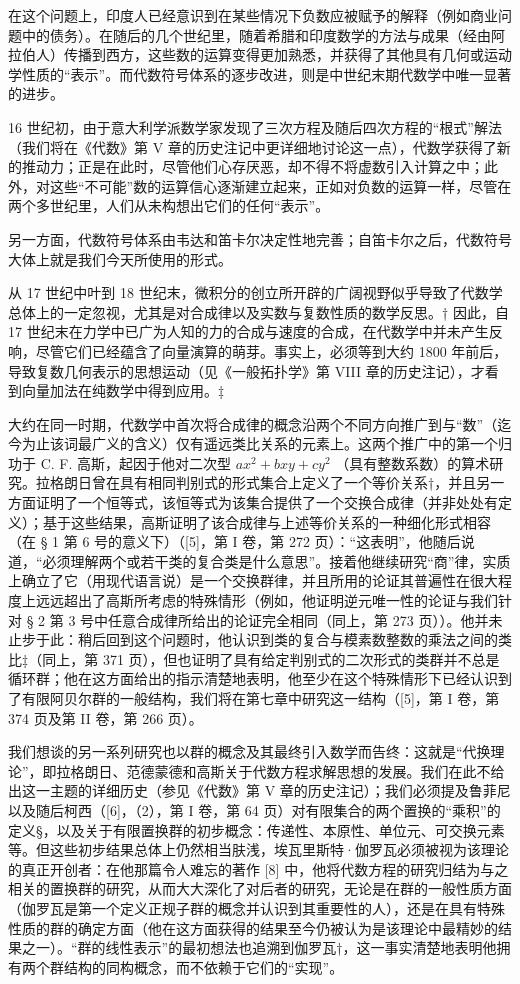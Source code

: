 在这个问题上，印度人已经意识到在某些情况下负数应被赋予的解释（例如商业问题中的债务）。在随后的几个世纪里，随着希腊和印度数学的方法与成果（经由阿拉伯人）传播到西方，这些数的运算变得更加熟悉，并获得了其他具有几何或运动学性质的“表示”。而代数符号体系的逐步改进，则是中世纪末期代数学中唯一显著的进步。

16 世纪初，由于意大利学派数学家发现了三次方程及随后四次方程的“根式”解法（我们将在《代数》第 V 章的历史注记中更详细地讨论这一点），代数学获得了新的推动力；正是在此时，尽管他们心存厌恶，却不得不将虚数引入计算之中；此外，对这些“不可能”数的运算信心逐渐建立起来，正如对负数的运算一样，尽管在两个多世纪里，人们从未构想出它们的任何“表示”。

另一方面，代数符号体系由韦达和笛卡尔决定性地完善；自笛卡尔之后，代数符号大体上就是我们今天所使用的形式。

从 17 世纪中叶到 18 世纪末，微积分的创立所开辟的广阔视野似乎导致了代数学总体上的一定忽视，尤其是对合成律以及实数与复数性质的数学反思。† 因此，自 17 世纪末在力学中已广为人知的力的合成与速度的合成，在代数学中并未产生反响，尽管它们已经蕴含了向量演算的萌芽。事实上，必须等到大约 1800 年前后，导致复数几何表示的思想运动（见《一般拓扑学》第 VIII 章的历史注记），才看到向量加法在纯数学中得到应用。‡

大约在同一时期，代数学中首次将合成律的概念沿两个不同方向推广到与“数”（迄今为止该词最广义的含义）仅有遥远类比关系的元素上。这两个推广中的第一个归功于 C. F. 高斯，起因于他对二次型 \(ax^{2} + bxy + cy^{2}\) （具有整数系数）的算术研究。拉格朗日曾在具有相同判别式的形式集合上定义了一个等价关系†，并且另一方面证明了一个恒等式，该恒等式为该集合提供了一个交换合成律（并非处处有定义）；基于这些结果，高斯证明了该合成律与上述等价关系的一种细化形式相容（在 § 1 第 6 号的意义下）（{[}5{]}，第 I 卷，第 272 页）：“这表明”，他随后说道，“必须理解两个或若干类的复合类是什么意思”。接着他继续研究“商”律，实质上确立了它（用现代语言说）是一个交换群律，并且所用的论证其普遍性在很大程度上远远超出了高斯所考虑的特殊情形（例如，他证明逆元唯一性的论证与我们针对 § 2 第 3 号中任意合成律所给出的论证完全相同（同上，第 273 页））。他并未止步于此：稍后回到这个问题时，他认识到类的复合与模素数整数的乘法之间的类比‡（同上，第 371 页），但也证明了具有给定判别式的二次形式的类群并不总是循环群；他在这方面给出的指示清楚地表明，他至少在这个特殊情形下已经认识到了有限阿贝尔群的一般结构，我们将在第七章中研究这一结构（{[}5{]}，第 I 卷，第 374 页及第 II 卷，第 266 页）。

我们想谈的另一系列研究也以群的概念及其最终引入数学而告终：这就是“代换理论”，即拉格朗日、范德蒙德和高斯关于代数方程求解思想的发展。我们在此不给出这一主题的详细历史（参见《代数》第 V 章的历史注记）；我们必须提及鲁菲尼以及随后柯西（{[}6{]}，（2），第 I 卷，第 64 页）对有限集合的两个置换的“乘积”的定义§，以及关于有限置换群的初步概念：传递性、本原性、单位元、可交换元素等。但这些初步结果总体上仍然相当肤浅，埃瓦里斯特·伽罗瓦必须被视为该理论的真正开创者：在他那篇令人难忘的著作 {[}8{]} 中，他将代数方程的研究归结为与之相关的置换群的研究，从而大大深化了对后者的研究，无论是在群的一般性质方面（伽罗瓦是第一个定义正规子群的概念并认识到其重要性的人），还是在具有特殊性质的群的确定方面（他在这方面获得的结果至今仍被认为是该理论中最精妙的结果之一）。“群的线性表示”的最初想法也追溯到伽罗瓦†，这一事实清楚地表明他拥有两个群结构的同构概念，而不依赖于它们的“实现”。

